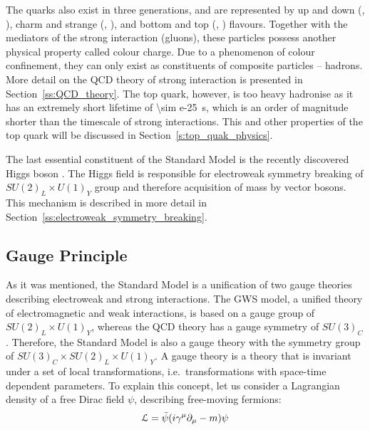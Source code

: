 The quarks also exist in three generations, and are represented by up and down (\cPqu, \cPqd), charm and strange (\cPqc,
\cPqs), and bottom and top (\cPqb, \cPqt) flavours. Together with the mediators of the strong interaction (gluons),
these particles possess another physical property called colour charge. Due to a phenomenon of colour confinement, they
can only exist as constituents of composite particles -- hadrons. More detail on the QCD theory of strong interaction is
presented in Section~\ref{ss:QCD_theory}. The top quark, however, is too heavy hadronise as it has an extremely short
lifetime of \SI{\sim e-25}{\s}, which is an order of magnitude shorter than the timescale of strong interactions. This
and other properties of the top quark will be discussed in Section~\ref{s:top_quak_physics}.

The last essential constituent of the Standard Model is the recently discovered Higgs boson
\autocite{ATLAS_higgs_observation, CMS_higgs_observation}. The Higgs field is responsible for electroweak symmetry
breaking of $SU(2)_L \times U(1)_Y$ group and therefore acquisition of mass by vector bosons. This mechanism is
described in more detail in Section~\ref{ss:electroweak_symmetry_breaking}.



\newpage
\subsection{Gauge Principle}
\label{ss:gauge_principle}
As it was mentioned, the Standard Model is a unification of two gauge theories describing electroweak and strong
interactions. The GWS model, a unified theory of electromagnetic and weak interactions, is based on a gauge group of
$SU(2)_L \times U(1)_Y$, whereas the QCD theory has a gauge symmetry of $SU(3)_C$. Therefore, the Standard Model is also
a gauge theory with the symmetry group of $SU(3)_C \times SU(2)_L \times U(1)_Y$. A gauge theory is a theory that is
invariant under a set of local transformations, i.e.\ transformations with space-time dependent parameters. To explain
this concept, let us consider a Lagrangian density of a free Dirac field $\psi$, describing free-moving fermions:
\begin{equation}
\mathcal{L} = \bar{\psi}(i \gamma^\mu	\partial_\mu - m) \psi
\label{eq:dirac_field_L}
\end{equation}

